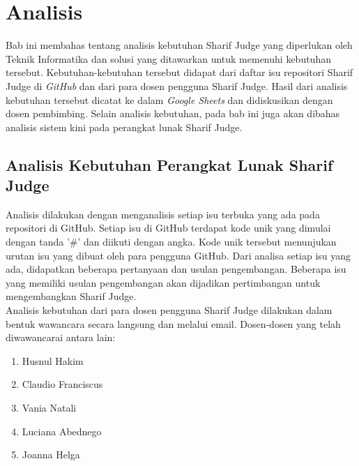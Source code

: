\chapter{Analisis}
\label{chap:analisis}

Bab ini membahas tentang analisis kebutuhan Sharif Judge yang diperlukan oleh Teknik Informatika dan solusi yang ditawarkan untuk memenuhi kebutuhan tersebut. Kebutuhan-kebutuhan tersebut didapat dari daftar isu repositori Sharif Judge di \textit{GitHub} dan dari para dosen pengguna Sharif Judge. Hasil dari analisis kebutuhan tersebut dicatat ke dalam \textit{Google Sheets} dan didiskusikan dengan dosen pembimbing. Selain analisis kebutuhan, pada bab ini juga akan dibahas analisis sistem kini pada perangkat lunak Sharif Judge.


\section{Analisis Kebutuhan Perangkat Lunak Sharif Judge}
\label{sec:analisis}
Analisis dilakukan dengan menganalisis setiap isu terbuka yang ada pada repositori di GitHub. Setiap isu di GitHub terdapat kode unik yang dimulai dengan tanda '\#' dan diikuti dengan angka. Kode unik tersebut menunjukan urutan isu yang dibuat oleh para pengguna GitHub. Dari analisa setiap isu yang ada, didapatkan beberapa pertanyaan dan usulan pengembangan. Beberapa isu yang memiliki usulan pengembangan akan dijadikan pertimbangan untuk mengembangkan Sharif Judge. \\

Analisis kebutuhan dari para dosen pengguna Sharif Judge dilakukan dalam bentuk wawancara secara langsung dan melalui email. Dosen-dosen yang telah diwawancarai antara lain:
\begin{enumerate}
	\item Husnul Hakim
	\item Claudio Franciscus
	\item Vania Natali
	\item Luciana Abednego
	\item Joanna Helga
\end{enumerate}

